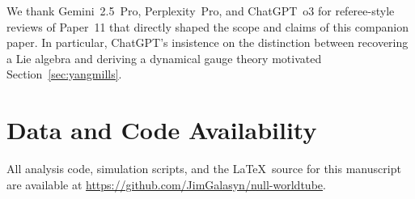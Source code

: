\documentclass[11pt]{article}
\begin{document}
We thank Gemini~2.5~Pro, Perplexity~Pro, and ChatGPT~o3 for
referee-style reviews of Paper~11 that directly shaped the scope and
claims of this companion paper.  In particular, ChatGPT's insistence
on the distinction between recovering a Lie algebra and deriving a
dynamical gauge theory motivated Section~\ref{sec:yangmills}.

\section*{Data and Code Availability}

All analysis code, simulation scripts, and the \LaTeX\ source for this
manuscript are available at
\url{https://github.com/JimGalasyn/null-worldtube}.

\end{document}
